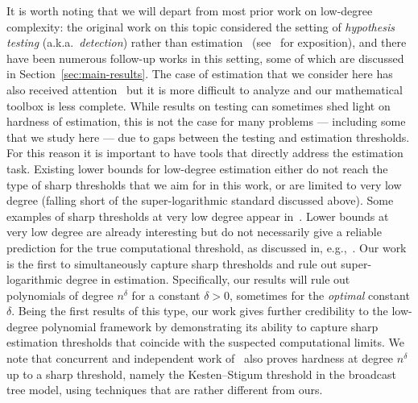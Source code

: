 \documentclass[11pt]{article}
\begin{document}
It is worth noting that we will depart from most prior work on low-degree complexity: the original work on this topic considered the setting of \emph{hypothesis testing} (a.k.a.\ \emph{detection}) rather than estimation~\cite{sos-detect,HS-bayesian} (see~\cite{hopkins-thesis,ld-notes} for exposition), and there have been numerous follow-up works in this setting, some of which are discussed in Section~\ref{sec:main-results}. The case of estimation that we consider here has also received attention~\cite{SW-estimation,LZ-tensor,KM-tree,tensor-decomp-LD,MW-amp,graphon,dense-cycle,HM-tree,tensor-cumulants,opt-bot} but it is more difficult to analyze and our mathematical toolbox is less complete. While results on testing can sometimes shed light on hardness of estimation, this is not the case for many problems --- including some that we study here --- due to gaps between the testing and estimation thresholds. For this reason it is important to have tools that directly address the estimation task. Existing lower bounds for low-degree estimation either do not reach the type of sharp thresholds that we aim for in this work, or are limited to very low degree (falling short of the super-logarithmic standard discussed above). Some examples of sharp thresholds at very low degree appear in~\cite{SW-estimation,MW-amp,HM-tree}. Lower bounds at very low degree are already interesting but do not necessarily give a reliable prediction for the true computational threshold, as discussed in, e.g.,~\cite{counting-stars}. Our work is the first to simultaneously capture sharp thresholds and rule out super-logarithmic degree in estimation. Specifically, our results will rule out polynomials of degree $n^\delta$ for a constant $\delta > 0$, sometimes for the \emph{optimal} constant $\delta$. Being the first results of this type, our work gives further credibility to the low-degree polynomial framework by demonstrating its ability to capture sharp estimation thresholds that coincide with the suspected computational limits. We note that concurrent and independent work of~\cite{opt-bot} also proves hardness at degree $n^\delta$ up to a sharp threshold, namely the Kesten--Stigum threshold in the broadcast tree model, using techniques that are rather different from ours.
\end{document}
